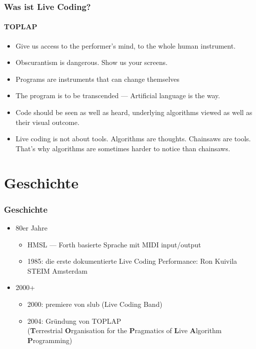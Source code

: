 \documentclass{beamer}
\begin{document}
\begin{frame}
  \frametitle{Was ist Live Coding?}
  \framesubtitle{TOPLAP}
  \small
  \begin{itemize}
    \item Give us access to the performer's mind, to the whole human instrument.
    \item Obscurantism is dangerous. Show us your screens.
    \item Programs are instruments that can change themselves
    \item The program is to be transcended --- Artificial language is the way.
    \item Code should be seen as well as heard, underlying algorithms viewed as well as their visual outcome.
    \item Live coding is not about tools. Algorithms are thoughts. Chainsaws are tools. That's why algorithms are sometimes harder to notice than chainsaws.
  \end{itemize}
\end{frame}

\section{Geschichte}
\begin{frame}
  \frametitle{Geschichte}
  \begin{itemize}
    \item 80er Jahre
      \begin{itemize}
        \item HMSL --- Forth basierte Sprache mit MIDI input/output
        \pause\item 1985: die erste dokumentierte Live Coding Performance: Ron Kuivila STEIM Amsterdam
      \end{itemize}
    \pause{}
    \item 2000+
      \begin{itemize}
        \item 2000: premiere von slub (Live Coding Band)
        \pause\item 2004: Gründung von TOPLAP \\ (\textbf{T}errestrial \textbf{O}rganisation for the \textbf{P}ragmatics of \textbf{L}ive \textbf{A}lgorithm \textbf{P}rogramming)
      \end{itemize}
  \end{itemize}
\end{frame}
\end{document}
